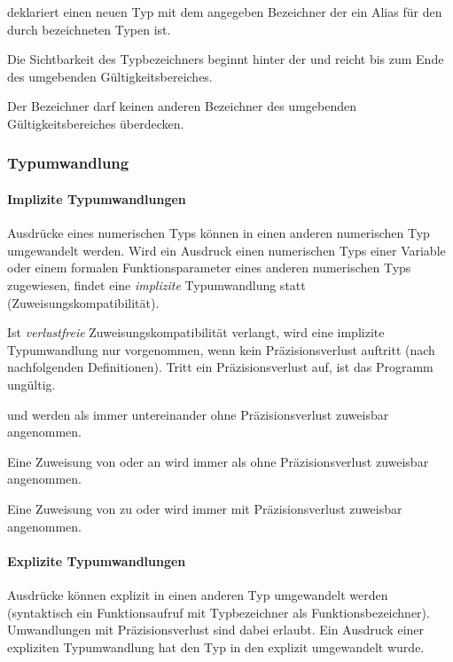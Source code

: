  deklariert einen neuen Typ mit dem angegeben Bezeichner der ein Alias für den durch \glq{}\grq bezeichneten Typen ist.

Die Sichtbarkeit des Typbezeichners beginnt hinter der 
und reicht bis zum Ende des umgebenden Gültigkeitsbereiches.

Der Bezeichner darf keinen anderen Bezeichner des umgebenden Gültigkeitsbereiches überdecken.


\subsubsection{Typumwandlung}\label{Typumwandlung}

\paragraph{{Implizite Typumwandlungen}}\label{__Implizite Typumwandlungen__}
Ausdrücke eines numerischen Typs können in einen anderen numerischen Typ umgewandelt werden.
Wird ein Ausdruck einen numerischen Typs einer Variable oder einem formalen Funktionsparameter
eines anderen numerischen Typs zugewiesen, findet eine \emph{implizite} Typumwandlung statt
(Zuweisungskompatibilität).

Ist \emph{verlustfreie} Zuweisungskompatibilität verlangt, wird eine implizite Typumwandlung nur
vorgenommen, wenn kein Präzisionsverlust auftritt (nach nachfolgenden Definitionen). Tritt ein
Präzisionsverlust auf, ist das Programm ungültig.

 und  werden als immer untereinander ohne Präzisionsverlust zuweisbar
angenommen.

Eine Zuweisung von  oder  an  wird immer als ohne Präzisionsverlust zuweisbar
angenommen.

Eine Zuweisung von  zu  oder  wird immer mit Präzisionsverlust zuweisbar angenommen.

\paragraph{{Explizite Typumwandlungen}}\label{__Explizite Typumwandlungen__}
Ausdrücke können explizit in einen anderen Typ umgewandelt werden (syntaktisch ein Funktionsaufruf mit
Typbezeichner als Funktionsbezeichner). Umwandlungen mit Präzisionsverlust sind dabei erlaubt.
Ein Ausdruck einer expliziten Typumwandlung hat den Typ in den explizit umgewandelt wurde.


